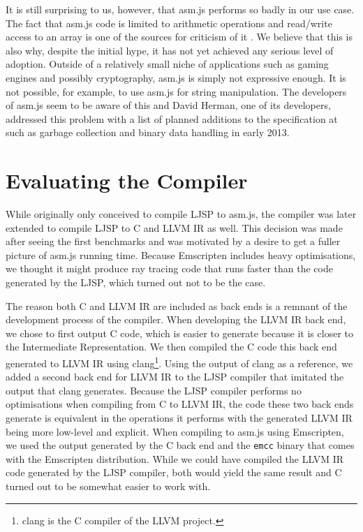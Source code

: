\documentclass[11pt]{report}
\begin{document}
It is still surprising to us, however, that asm.js performs so badly in our use case. The fact that asm.js code is limited to arithmetic operations and read/write access to an array is one of the sources for criticism of it \cite{adblock, whybothers}. We believe that this is also why, despite the initial hype, it has not yet achieved any serious level of adoption. Outside of a relatively small niche of applications such as gaming engines and possibly cryptography, asm.js is simply not expressive enough. It is not possible, for example, to use asm.js for string manipulation. The developers of asm.js seem to be aware of this and David Herman, one of its developers, addressed this problem with a list of planned additions to the specification at \cite{asmjsadditions} such as garbage collection and binary data handling in early 2013.

\section{Evaluating the Compiler}


While originally only conceived to compile LJSP to asm.js, the compiler was later extended to compile LJSP to C and LLVM IR as well. This decision was made after seeing the first benchmarks and was motivated by a desire to get a fuller picture of asm.js running time. Because Emscripten includes heavy optimisations, we thought it might produce ray tracing code that runs faster than the code generated by the LJSP, which turned out not to be the case. 

The reason both C and LLVM IR are included as back ends is a remnant of the development process of the compiler. When developing the LLVM IR back end, we chose to first output C code, which is easier to generate because it is closer to the Intermediate Representation. We then compiled the C code this back end generated to LLVM IR using clang\footnote{clang is the C compiler of the LLVM project.}. Using the output of clang as a reference, we added a second back end for LLVM IR to the LJSP compiler that imitated the output that clang generates. Because the LJSP compiler performs no optimisations when compiling from C to LLVM IR, the code these two back ends generate is equivalent in the operations it performs with the generated LLVM IR being more low-level and explicit. When compiling to asm.js using Emscripten, we used the output generated by the C back end and the \texttt{emcc} binary that comes with the Emscripten distribution. While we could have compiled the LLVM IR code generated by the LJSP compiler, both would yield the same result and C turned out to be somewhat easier to work with.
\end{document}
